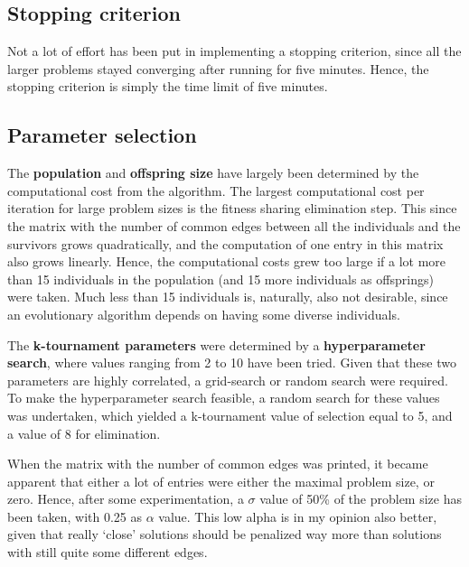 \documentclass[a4paper,10pt]{article}
\newcommand{\ReplaceMe}[1]{{\color{blue}#1}}
\begin{document}
\subsection{Stopping criterion}
Not a lot of effort has been put in implementing a stopping criterion, since all the larger problems stayed converging after running for five minutes. Hence, the stopping criterion is simply the time limit of five minutes.


\subsection{Parameter selection}
\label{parameter_selection}
The \textbf{population} and \textbf{offspring size} have largely been determined by the computational cost from the algorithm. The largest computational cost per iteration for large problem sizes is the fitness sharing elimination step. This since the matrix with the number of common edges between all the individuals and the survivors grows quadratically, and the computation of one entry in this matrix also grows linearly. Hence, the computational costs grew too large if a lot more than 15 individuals in the population (and 15 more individuals as offsprings) were taken. Much less than 15 individuals is, naturally, also not desirable, since an evolutionary algorithm depends on having some diverse individuals.

The \textbf{k-tournament parameters} were determined by a \textbf{hyperparameter search}, where values ranging from 2 to 10 have been tried. Given that these two parameters are highly correlated, a grid-search or random search were required. To make the hyperparameter search feasible, a random search for these values was undertaken, which yielded a k-tournament value of selection equal to 5, and a value of 8 for elimination.

When the matrix with the number of common edges was printed, it became apparent that either a lot of entries were either the maximal problem size, or zero. Hence, after some experimentation, a $\sigma$ value of 50\% of the problem size has been taken, with 0.25 as $\alpha$ value. This low alpha is in my opinion also better, given that really `close' solutions should be penalized way more than solutions with still quite some different edges.
\end{document}
